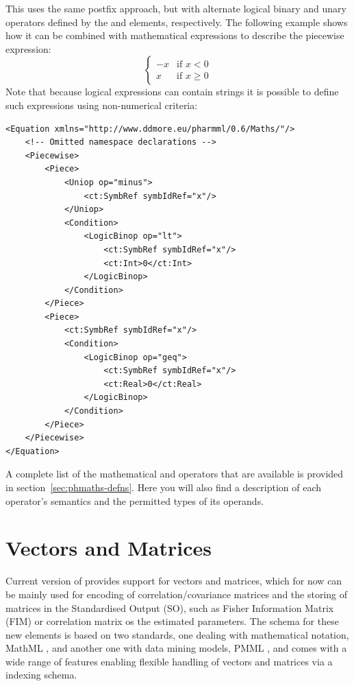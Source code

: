 This uses the same postfix approach, but with alternate logical binary
and unary operators defined by the  and
 elements, respectively. The following example shows
how it can be combined with mathematical expressions to describe the
piecewise expression:
%
\[
\begin{cases}
-x & \text{if } x < 0\\
 x & \text{if } x \geq 0
\end{cases}
\]
%
Note that because logical expressions can contain strings it is
possible to define such expressions using non-numerical criteria:
%
\lstset{language=XML}
\begin{lstlisting}
<Equation xmlns="http://www.ddmore.eu/pharmml/0.6/Maths/"/>
    <!-- Omitted namespace declarations -->
    <Piecewise>
        <Piece>
            <Uniop op="minus">
                <ct:SymbRef symbIdRef="x"/>
            </Uniop>
            <Condition>
                <LogicBinop op="lt">
                    <ct:SymbRef symbIdRef="x"/>
                    <ct:Int>0</ct:Int>
                </LogicBinop>
            </Condition>
        </Piece>
        <Piece>
            <ct:SymbRef symbIdRef="x"/>
            <Condition>
                <LogicBinop op="geq">
                    <ct:SymbRef symbIdRef="x"/>
                    <ct:Real>0</ct:Real>
                </LogicBinop>
            </Condition>
        </Piece>
    </Piecewise>
</Equation>
\end{lstlisting}
%
A complete list of the mathematical and operators that are available
is provided in section~\ref{sec:phmaths-defns}.  Here you will also
find a description of each operator's semantics and the permitted types
of its operands.

\section{Vectors and Matrices}
\label{sec:vectorsAndMatrices}
Current version of \pharmml provides support for vectors and matrices, which for 
now can be mainly used for encoding of correlation/covariance matrices and the storing of
matrices in the Standardised Output (SO), such as Fisher Information Matrix (FIM)
or correlation matrix os the estimated parameters.
The schema for these new elements is based on two standards, one dealing with 
mathematical notation, MathML \cite{mathml3:2010}, 
and another one with data mining models, PMML \cite{pmml:2014}, and comes with 
a wide range of features enabling flexible handling of vectors and matrices via a 
indexing schema.

